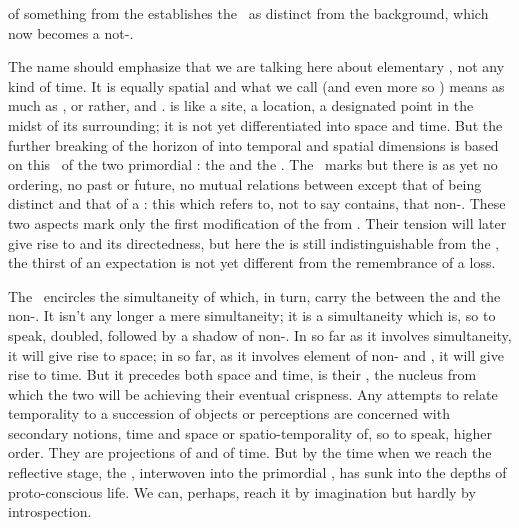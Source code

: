 \pa {} of something from the  establishes the \hoa\ as
distinct from the background, which now becomes a not-\herenow.

The name \wo{\herenow} should emphasize that we are talking here about
elementary \hoa, not any kind of time.  It is equally spatial and what we call
 (and even more so ) means as much
 as , or rather,  and .
 is like a site, a location, a designated point in the midst of
its surrounding; it is not yet differentiated into space and time.  But the
further breaking of the horizon of  into temporal and spatial
dimensions is based on this \nexus\ of the two primordial : the
 and the .  The \hoa\ marks  but there
is as yet no ordering, no past or future, no mutual relations between
 except that of being distinct and that of a : this
 which refers to, not to say contains, that non-. These
two aspects mark only the first modification of the  from
. Their tension will later give rise to
 and its directedness, but here the  is still
indistinguishable from the , the thirst of an expectation is
not yet different from the remembrance of a loss.

The \hoa\ encircles the simultaneity of   which, in
turn, carry the  between the  and the
non-.  It isn't any longer a mere simultaneity; it is a simultaneity
which is, so to speak, doubled, followed by a shadow of non-.  In
so far as it involves simultaneity, it will give rise to space; in so far, as it
involves element of non- and , it will give rise
to time.  But it 
precedes both space and time, is their  \nexus, the nucleus
from which the two  will be  achieving their
eventual crispness.
%
Any attempts to relate temporality to a succession of objects or perceptions are
concerned with secondary notions, time and space or spatio-temporality of, so to
speak, higher order. They are projections of  and  of time. But by the time when we reach the reflective stage, the
, interwoven into the primordial , has
sunk into the depths of proto-conscious life. We can, perhaps, reach it by
imagination but hardly by introspection.

